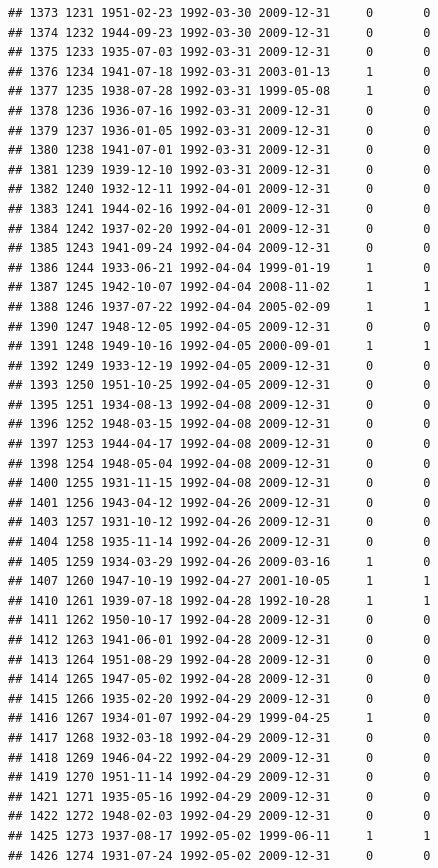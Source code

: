 \documentclass[
]{book}
\theoremstyle{definition}
\theoremstyle{definition}
\theoremstyle{definition}
\theoremstyle{definition}
\theoremstyle{remark}
\begin{document}
\begin{verbatim}
## 1373 1231 1951-02-23 1992-03-30 2009-12-31     0       0
## 1374 1232 1944-09-23 1992-03-30 2009-12-31     0       0
## 1375 1233 1935-07-03 1992-03-31 2009-12-31     0       0
## 1376 1234 1941-07-18 1992-03-31 2003-01-13     1       0
## 1377 1235 1938-07-28 1992-03-31 1999-05-08     1       0
## 1378 1236 1936-07-16 1992-03-31 2009-12-31     0       0
## 1379 1237 1936-01-05 1992-03-31 2009-12-31     0       0
## 1380 1238 1941-07-01 1992-03-31 2009-12-31     0       0
## 1381 1239 1939-12-10 1992-03-31 2009-12-31     0       0
## 1382 1240 1932-12-11 1992-04-01 2009-12-31     0       0
## 1383 1241 1944-02-16 1992-04-01 2009-12-31     0       0
## 1384 1242 1937-02-20 1992-04-01 2009-12-31     0       0
## 1385 1243 1941-09-24 1992-04-04 2009-12-31     0       0
## 1386 1244 1933-06-21 1992-04-04 1999-01-19     1       0
## 1387 1245 1942-10-07 1992-04-04 2008-11-02     1       1
## 1388 1246 1937-07-22 1992-04-04 2005-02-09     1       1
## 1390 1247 1948-12-05 1992-04-05 2009-12-31     0       0
## 1391 1248 1949-10-16 1992-04-05 2000-09-01     1       1
## 1392 1249 1933-12-19 1992-04-05 2009-12-31     0       0
## 1393 1250 1951-10-25 1992-04-05 2009-12-31     0       0
## 1395 1251 1934-08-13 1992-04-08 2009-12-31     0       0
## 1396 1252 1948-03-15 1992-04-08 2009-12-31     0       0
## 1397 1253 1944-04-17 1992-04-08 2009-12-31     0       0
## 1398 1254 1948-05-04 1992-04-08 2009-12-31     0       0
## 1400 1255 1931-11-15 1992-04-08 2009-12-31     0       0
## 1401 1256 1943-04-12 1992-04-26 2009-12-31     0       0
## 1403 1257 1931-10-12 1992-04-26 2009-12-31     0       0
## 1404 1258 1935-11-14 1992-04-26 2009-12-31     0       0
## 1405 1259 1934-03-29 1992-04-26 2009-03-16     1       0
## 1407 1260 1947-10-19 1992-04-27 2001-10-05     1       1
## 1410 1261 1939-07-18 1992-04-28 1992-10-28     1       1
## 1411 1262 1950-10-17 1992-04-28 2009-12-31     0       0
## 1412 1263 1941-06-01 1992-04-28 2009-12-31     0       0
## 1413 1264 1951-08-29 1992-04-28 2009-12-31     0       0
## 1414 1265 1947-05-02 1992-04-28 2009-12-31     0       0
## 1415 1266 1935-02-20 1992-04-29 2009-12-31     0       0
## 1416 1267 1934-01-07 1992-04-29 1999-04-25     1       0
## 1417 1268 1932-03-18 1992-04-29 2009-12-31     0       0
## 1418 1269 1946-04-22 1992-04-29 2009-12-31     0       0
## 1419 1270 1951-11-14 1992-04-29 2009-12-31     0       0
## 1421 1271 1935-05-16 1992-04-29 2009-12-31     0       0
## 1422 1272 1948-02-03 1992-04-29 2009-12-31     0       0
## 1425 1273 1937-08-17 1992-05-02 1999-06-11     1       1
## 1426 1274 1931-07-24 1992-05-02 2009-12-31     0       0

\end{verbatim}
\end{document}
